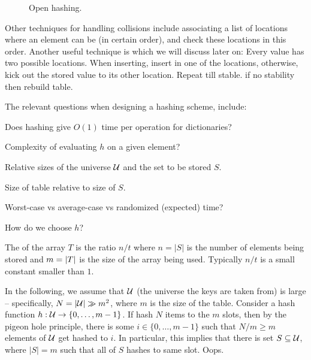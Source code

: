 \begin{figure}
    \centerline{}
    \caption{Open hashing.}
\end{figure}

\smallskip%

Other techniques for handling collisions include associating a list of
locations where an element can be (in certain order), and check these
locations in this order. Another useful technique is  which we will discuss later on: Every value has two
possible locations. When inserting, insert in one of the locations,
otherwise, kick out the stored value to its other location. Repeat
till stable. if no stability then rebuild table.
    
The relevant questions when designing a hashing scheme, include:
\begin{compactenumI}%
    \smallskip%
    \item Does hashing give $O(1)$ time per operation for
    dictionaries?

    \smallskip%
    \item Complexity of evaluating $h$ on a given element?

    \smallskip%
    \item Relative sizes of the universe $\mathcal{U}$ and the set to be
    stored $S$.  \item Size of table relative to size of $S$.  \item
    Worst-case vs average-case vs randomized (expected) time?  \item
    How do we choose $h$?
\end{compactenumI}

The  of the array $T$ is the ratio $n/t$ where
$n = |S|$ is the number of elements being stored and $m = \left| {T} \right|$
is the size of the array being used.  Typically $n/t$ is a small
constant smaller than $1$.

In the following, we assume that $\mathcal{U}$ (the universe the keys are
taken from) is large -- specifically, $N = \left| {\mathcal{U}} \right| \gg m^2$,
where $m$ is the size of the table.  Consider a hash function
$h : \mathcal{U} \rightarrow \{0,\ldots, m-1\}$.  If hash $N$ items to the $m$
slots, then by the pigeon hole principle, there is some
$i \in \{0,\ldots,m-1\}$ such that $N/m \geq m$ elements of $\mathcal{U}$ get
hashed to $i$.  In particular, this implies that there is set
$S \subseteq \mathcal{U}$, where $|S| = m$ such that all of $S$ hashes to same
slot. Oops.

